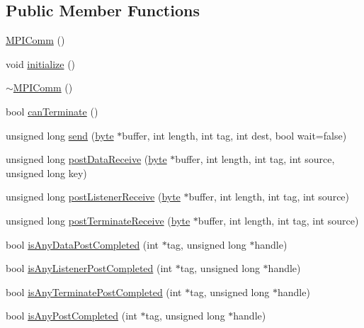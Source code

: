 \subsection*{Public Member Functions}
\begin{DoxyCompactItemize}
\item 
\hyperlink{class_m_p_i_comm_a2795c73e5730d893f195efa58e06ee8d}{MPIComm} ()
\item 
void \hyperlink{class_m_p_i_comm_aa21508c017028ad002b01cdecc10a247}{initialize} ()
\item 
\hyperlink{class_m_p_i_comm_a675ded15d2ea6e5fda6d31826c5e402f}{$\sim$MPIComm} ()
\item 
bool \hyperlink{class_m_p_i_comm_ae9829165ffcff61c0faea65b30e9a8c1}{canTerminate} ()
\item 
unsigned long \hyperlink{class_m_p_i_comm_a878df4e9c57f117f192a8bfee009ff94}{send} (\hyperlink{engine_8hpp_a0c8186d9b9b7880309c27230bbb5e69d}{byte} $\ast$buffer, int length, int tag, int dest, bool wait=false)
\item 
unsigned long \hyperlink{class_m_p_i_comm_adac7de30f89639b574623e73c16fc0d6}{postDataReceive} (\hyperlink{engine_8hpp_a0c8186d9b9b7880309c27230bbb5e69d}{byte} $\ast$buffer, int length, int tag, int source, unsigned long key)
\item 
unsigned long \hyperlink{class_m_p_i_comm_a37121a71b4636a713e4b3b0655efbc6e}{postListenerReceive} (\hyperlink{engine_8hpp_a0c8186d9b9b7880309c27230bbb5e69d}{byte} $\ast$buffer, int length, int tag, int source)
\item 
unsigned long \hyperlink{class_m_p_i_comm_a15aa65ec7dcb1da5fa042fd6d98f1578}{postTerminateReceive} (\hyperlink{engine_8hpp_a0c8186d9b9b7880309c27230bbb5e69d}{byte} $\ast$buffer, int length, int tag, int source)
\item 
bool \hyperlink{class_m_p_i_comm_ace0d0f43b30dcb479d387c7d39735cd9}{isAnyDataPostCompleted} (int $\ast$tag, unsigned long $\ast$handle)
\item 
bool \hyperlink{class_m_p_i_comm_ae34314bc322812be2fa99db0ad1687a2}{isAnyListenerPostCompleted} (int $\ast$tag, unsigned long $\ast$handle)
\item 
bool \hyperlink{class_m_p_i_comm_a0e84bad56ed23e721626ac1273a90670}{isAnyTerminatePostCompleted} (int $\ast$tag, unsigned long $\ast$handle)
\item 
bool \hyperlink{class_m_p_i_comm_a897fbe8d99735dec4088197b9c4f2a23}{isAnyPostCompleted} (int $\ast$tag, unsigned long $\ast$handle)
\item 

\end{DoxyCompactItemize}
